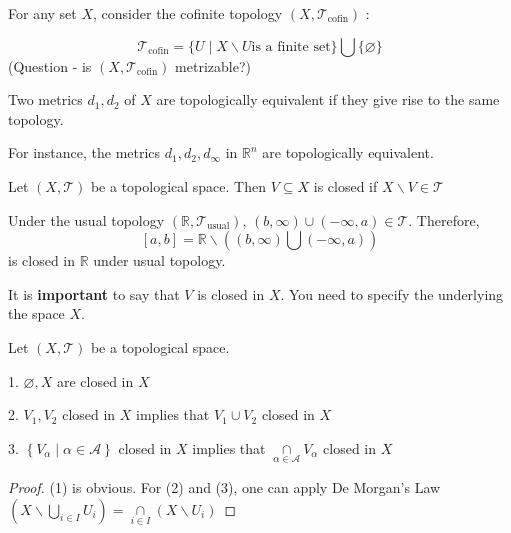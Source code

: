 \begin{example}
For any set $X$, consider the cofinite topology \(\left({X,{\mathcal{T}}_{\text{cofin}}}\right)\) :

\[
{\mathcal{T}}_{\text{cofin}} = \{ U \mid  X \smallsetminus  U\text{is a finite set}\} \bigcup \{ \varnothing \}
\]
(Question - is \(\left({X,{\mathcal{T}}_{\text{cofin}}}\right)\) metrizable?)
\end{example}

\begin{definition} [Equivalence] Two metrics $d_1, d_2$ of $X$ are topologically equivalent if they give rise to the same topology.
\end{definition}

For instance, the metrics \({d}_{1},{d}_{2},{d}_{\infty}\) in \({\mathbb{R}}^{n}\) are topologically equivalent.

\begin{definition} Let $(X, \mathcal{T})$ be a topological space. Then \(V \subseteq  X\) is closed if \(X \smallsetminus  V \in  \mathcal{T}\)
\end{definition}
\begin{example} Under the usual topology \(\left({\mathbb{R},{\mathcal{T}}_{\text{usual}}}\right)\), \(\left({b,\infty}\right)  \cup  \left({-\infty,a}\right)  \in  \mathcal{T}\). Therefore,
\[
\left\lbrack  {a,b}\right\rbrack   = \mathbb{R} \smallsetminus  \left({\left({b,\infty}\right) \bigcup \left({-\infty,a}\right)}\right)
\]
is closed in \(\mathbb{R}\) under usual topology.
\end{example}

It is {\bf important} to say that \(V\) is closed in \(X\). You need to specify the underlying the space \(X\).

\begin{proposition} Let $(X, \mathcal{T})$ be a topological space. 

1. \(\varnothing,X\) are closed in \(X\)

2. \({V}_{1},{V}_{2}\) closed in \(X\) implies that \({V}_{1} \cup  {V}_{2}\) closed in \(X\)

3. \(\left\{  {{V}_{\alpha} \mid  \alpha  \in  \mathcal{A}}\right\}\) closed in \(X\) implies that \(\mathop{\cap}\limits_{{\alpha  \in  \mathcal{A}}}{V}_{\alpha}\) closed in \(X\)
\end{proposition}

\begin{proof} (1) is obvious. For (2) and (3), one can apply De Morgan's Law
\(\left({X \smallsetminus  \mathop{\bigcup}\limits_{{i \in  I}}{U}_{i}}\right)  = \mathop{\cap}\limits_{{i \in  I}}\left({X \smallsetminus  {U}_{i}}\right)\)
\end{proof}

